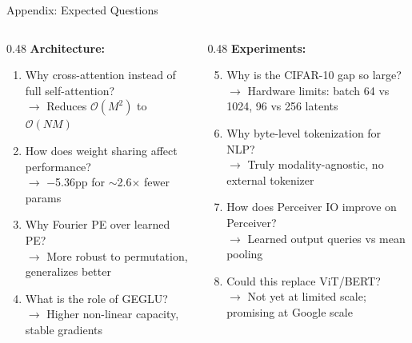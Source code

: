 \documentclass[aspectratio=169,11pt]{beamer}
\begin{document}
\begin{frame}{Appendix: Expected Questions}
  \begin{columns}[T]
    \begin{column}{0.48\textwidth}
      \textbf{Architecture:}
      \begin{enumerate}
        \item Why cross-attention instead of full self-attention?\\
          {\scriptsize $\rightarrow$ Reduces $\mathcal{O}(M^2)$ to $\mathcal{O}(NM)$}
        \item How does weight sharing affect performance?\\
          {\scriptsize $\rightarrow$ $-$5.36pp for $\sim$2.6$\times$ fewer params}
        \item Why Fourier PE over learned PE?\\
          {\scriptsize $\rightarrow$ More robust to permutation, generalizes better}
        \item What is the role of GEGLU?\\
          {\scriptsize $\rightarrow$ Higher non-linear capacity, stable gradients}
      \end{enumerate}
    \end{column}
    \begin{column}{0.48\textwidth}
      \textbf{Experiments:}
      \begin{enumerate}\setcounter{enumi}{4}
        \item Why is the CIFAR-10 gap so large?\\
          {\scriptsize $\rightarrow$ Hardware limits: batch 64 vs 1024, 96 vs 256 latents}
        \item Why byte-level tokenization for NLP?\\
          {\scriptsize $\rightarrow$ Truly modality-agnostic, no external tokenizer}
        \item How does Perceiver IO improve on Perceiver?\\
          {\scriptsize $\rightarrow$ Learned output queries vs mean pooling}
        \item Could this replace ViT/BERT?\\
          {\scriptsize $\rightarrow$ Not yet at limited scale; promising at Google scale}
      \end{enumerate}
    \end{column}
  \end{columns}
\end{frame}
\end{document}
